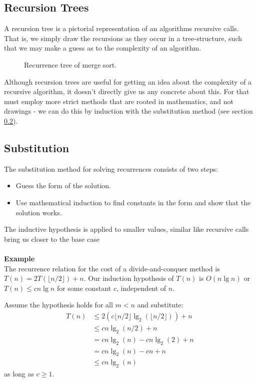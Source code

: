 \subsection{Recursion Trees}
A recursion tree is a pictorial representation of an algorithms recursive
calls. That is, we simply draw the recursions as they occur in a
tree-structure, such that we may make a guess as to the complexity of an
algorithm.

\begin{figure}[h]
	\caption{Recurrence tree of merge sort.}
\end{figure}

Although recursion trees are useful for getting an idea about the complexity
of a recursive algorithm, it doesn't directly give us any concrete about this.
For that must employ more strict methods that are rooted in mathematics, and
not drawings - we can do this by induction with the substitution method (see
section \ref{ch:divideandconquer|sub:recurrences|subsub:substitution}).
\clearpage
\subsection{Substitution}
\label{ch:divideandconquer|sub:recurrences|subsub:substitution}
The substitution method for solving recurrences consists of
two steps:
\begin{itemize}
\item Guess the form of the solution.
\item Use mathematical induction to find constants in the form and show that
the solution works.
\end{itemize}
The inductive hypothesis is applied to smaller values,
similar like recursive calls bring us closer to the base case
\\\\
\noindent \textbf{Example}\\
The recurrence relation for the cost of a divide-and-conquer method is
$T(n) = 2T( \lfloor n/2 \rfloor ) + n$. Our induction hypothesis of $T(n)$ is
$O(n \lg n)$ or $T(n) \leq cn \lg n$ for some constant $c$, independent of $n$.

Assume the hypothesis holds for all $m < n$ and substitute:
\begin{align}
	T(n) &\leq 2(c \lfloor n/2 \rfloor \lg_2 (\lfloor n/2 \rfloor )) + n \\
	&\leq cn \lg_2(n/2)+n \\
	&= cn \lg_2(n) - cn \lg_2(2)+n \\
	&= cn \lg_2(n) - cn + n \\
	&\leq cn \lg_2 (n)
\end{align}
as long as $c \geq 1$.

